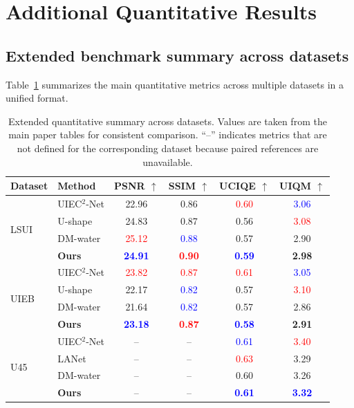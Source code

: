 \documentclass[runningheads]{llncs}
\newcommand{\best}[1]{\textcolor{red}{#1}}
\newcommand{\second}[1]{\textcolor{blue}{#1}}
\begin{document}
\section{Additional Quantitative Results}
\label{sec:supp_quant}

\subsection{Extended benchmark summary across datasets}
Table~\ref{tab:supp_quant_all} summarizes the main quantitative metrics across multiple datasets in a unified format.

\begin{table}[t]
\centering
\small
\caption{Extended quantitative summary across datasets. Values are taken from the main paper tables for consistent comparison. ``--'' indicates metrics that are not defined for the corresponding dataset because paired references are unavailable.}
\label{tab:supp_quant_all}
\begin{tabular}{@{}l l c c c c@{}}
\toprule
Dataset & Method & PSNR $\uparrow$ & SSIM $\uparrow$ & UCIQE $\uparrow$ & UIQM $\uparrow$ \\ \midrule
\multirow{4}{*}{LSUI} 
    & UIEC$^2$-Net & 22.96 & 0.86 & \best{0.60} & \second{3.06} \\
    & U-shape      & 24.83 & 0.87 & 0.56 & \best{3.08} \\
    & DM-water     & \best{25.12} & \second{0.88} & 0.57 & 2.90 \\
    & \textbf{Ours}           & \textbf{\second{24.91}} & \textbf{\best{0.90}} & \textbf{\second{0.59}} & \textbf{2.98} \\ \midrule
\multirow{4}{*}{UIEB} 
    & UIEC$^2$-Net & \best{23.82} & \best{0.87} & \best{0.61} & \second{3.05} \\
    & U-shape      & 22.17 & \second{0.82} & 0.57 & \best{3.10} \\
    & DM-water     & 21.64 & \second{0.82} & 0.57 & 2.86 \\
    & \textbf{Ours}           & \textbf{\second{23.18}} & \textbf{\best{0.87}} & \textbf{\second{0.58}} & \textbf{2.91} \\ \midrule
\multirow{4}{*}{U45} 
    & UIEC$^2$-Net & -- & -- & \second{0.61} & \best{3.40} \\
    & LANet        & -- & -- & \best{0.63} & 3.29 \\
    & DM-water     & -- & -- & 0.60 & 3.26 \\
    & \textbf{Ours}           & -- & -- & \textbf{\second{0.61}} & \textbf{\second{3.32}} \\ \bottomrule
\end{tabular}
\end{table}
\end{document}
